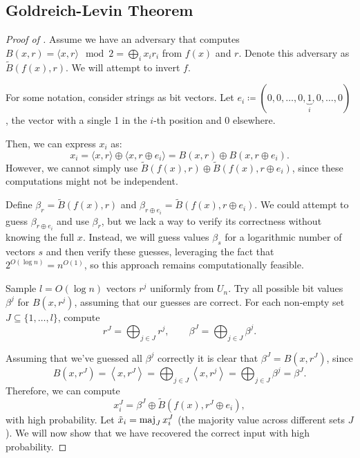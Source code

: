 
\subsection{Goldreich-Levin Theorem}
\goldreichlevin*
\begin{proof}[Proof of ] \label{proof:goldreich_levin}
    Assume we have an adversary that computes $B(x, r) = \langle x, r \rangle \mod 2 = \bigoplus_i x_i r_i$ from $f(x)$ and $r$. 
    Denote this adversary as $\tilde{B}(f(x), r)$.
    We will attempt to invert $f$.

    For some notation, consider strings as bit vectors.
    Let $e_i \coloneqq (0, 0, \ldots, 0, \underbrace{1}_i, 0, \ldots, 0)$, the vector with a single 1 in the $i$-th position and 0 elsewhere.

    Then, we can express $x_i$ as:
    \[
        x_i = \langle x, r \rangle \oplus \langle x, r \oplus e_i \rangle = B(x, r) \oplus B(x, r \oplus e_i).
    \] 
    However, we cannot simply use $\tilde{B}(f(x), r) \oplus \tilde{B}(f(x), r \oplus e_i)$, since these computations might not be independent.

    Define $\beta_r = \tilde{B}(f(x), r)$ and $\beta_{r \oplus e_i} = \tilde{B}(f(x), r \oplus e_i)$.
    We could attempt to guess $\beta_{r \oplus e_i}$ and use $\beta_r$, but we lack a way to verify its correctness without knowing the full $x$.
    Instead, we will guess values $\beta_s$ for a logarithmic number of vectors $s$ and then verify these guesses, leveraging the fact that $2^{O(\log n)} = n^{O(1)}$, so this approach remains computationally feasible.

    Sample $l = O(\log n)$ vectors $r^j$ uniformly from $U_n$.
    Try all possible bit values $\beta^j$ for $B(x, r^j)$, assuming that our guesses are correct.
    For each non-empty set $J \subseteq \{1, \ldots, l\}$, compute
    \[
        r^J = \bigoplus_{j \in J} r^j, \qquad \beta^J = \bigoplus_{j \in J} \beta^j.
    \] 

	Assuming that we've guessed all $\beta^{j}$ correctly it is clear that $\beta^{J} = B(x, r^{J})$, since
	\[
		B(x, r^{J}) = \left< x, r^{J} \right> = \bigoplus_{j \in J} \left< x, r^{j} \right> = \bigoplus_{j \in J} \beta^{j} = \beta^{J}
	.\] 
    Therefore, we can compute 
    \[
        x_{i}^J = \beta^J \oplus \tilde{B}(f(x), r^J \oplus e_i),
    \] with high probability.
    Let $\tilde{x}_i = \operatorname{maj}\limits_J x_i^J$ (the majority value across different sets $J$).
    We will now show that we have recovered the correct input with high probability.


\end{proof}
